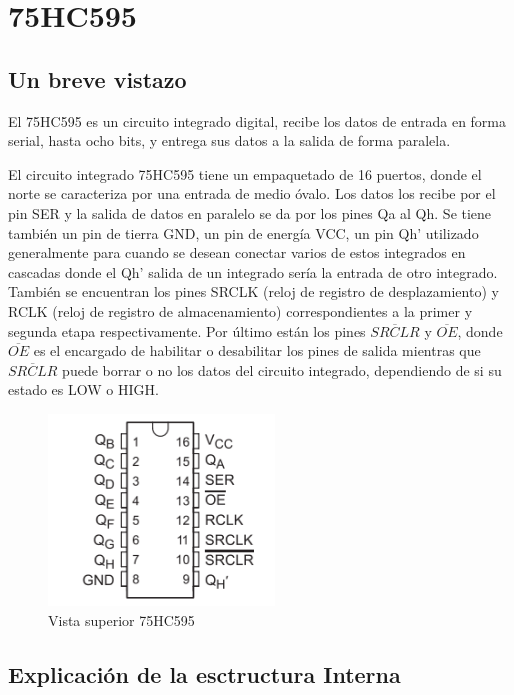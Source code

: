 \documentclass{article}
\begin{document}
\section{75HC595}
\subsection{Un breve vistazo}
El 75HC595 es un circuito integrado digital, recibe los datos de entrada en forma serial,  hasta ocho bits, y entrega sus datos a la salida de forma paralela. 

El circuito integrado 75HC595 tiene un empaquetado de 16 puertos, donde el norte se caracteriza por una entrada de medio óvalo. Los datos los recibe por el pin SER  y la salida de datos en paralelo se da por los pines Qa al Qh. Se tiene también un pin de tierra GND, un pin de energía VCC, un pin Qh' utilizado generalmente para cuando se desean conectar varios de estos integrados en cascadas donde el Qh' salida de un integrado sería la entrada de otro integrado. También se encuentran los pines SRCLK (reloj de registro de desplazamiento) y RCLK (reloj de registro de almacenamiento) correspondientes a la primer y segunda etapa respectivamente. Por último están los pines $\overline{SRCLR}$ y $\overline{OE}$, donde $\overline{OE}$ es el encargado de habilitar o desabilitar los pines de salida mientras que $\overline{SRCLR}$ puede borrar o no los datos del circuito integrado, dependiendo de si su estado es LOW o HIGH. 

    \begin{figure}[h]
    \includegraphics[width=6cm]{imagen/Pines ci.png}
    \centering
    \caption{Vista superior 75HC595}
    \label{fig:Pines ci}
    \end{figure}

\newpage
\subsection{Explicación de la esctructura Interna}
\end{document}
